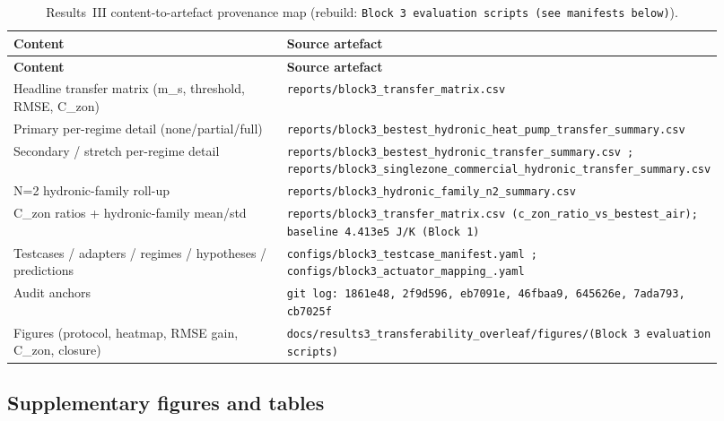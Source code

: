 \documentclass[11pt,a4paper]{article}
\begin{document}
\footnotesize
\begin{longtable}{@{}p{0.40\linewidth} p{0.52\linewidth}@{}}
\caption{Results~III content-to-artefact provenance map (rebuild: \texttt{Block~3 evaluation scripts (see manifests below)}).}\label{tab:prov-r3}\\
\textbf{Content} & \textbf{Source artefact}\\ \midrule \endfirsthead
\textbf{Content} & \textbf{Source artefact}\\ \midrule \endhead
Headline transfer matrix (m\_s, threshold, RMSE, C\_zon) & \texttt{reports/\allowbreak block3\_\allowbreak transfer\_\allowbreak matrix.csv} \\
Primary per-regime detail (none/partial/full) & \texttt{reports/\allowbreak block3\_\allowbreak bestest\_\allowbreak hydronic\_\allowbreak heat\_\allowbreak pump\_\allowbreak transfer\_\allowbreak summary.csv} \\
Secondary / stretch per-regime detail & \texttt{reports/\allowbreak block3\_\allowbreak bestest\_\allowbreak hydronic\_\allowbreak transfer\_\allowbreak summary.csv ; reports/\allowbreak block3\_\allowbreak singlezone\_\allowbreak commercial\_\allowbreak hydronic\_\allowbreak transfer\_\allowbreak summary.csv} \\
N=2 hydronic-family roll-up & \texttt{reports/\allowbreak block3\_\allowbreak hydronic\_\allowbreak family\_\allowbreak n2\_\allowbreak summary.csv} \\
C\_zon ratios + hydronic-family mean/std & \texttt{reports/\allowbreak block3\_\allowbreak transfer\_\allowbreak matrix.csv (c\_\allowbreak zon\_\allowbreak ratio\_\allowbreak vs\_\allowbreak bestest\_\allowbreak air); baseline 4.413e5 J/\allowbreak K (Block 1)} \\
Testcases / adapters / regimes / hypotheses / predictions & \texttt{configs/\allowbreak block3\_\allowbreak testcase\_\allowbreak manifest.yaml ; configs/\allowbreak block3\_\allowbreak actuator\_\allowbreak mapping\_\allowbreak *.yaml} \\
Audit anchors & \texttt{git log: 1861e48, 2f9d596, eb7091e, 46fbaa9, 645626e, 7ada793, cb7025f} \\
Figures (protocol, heatmap, RMSE gain, C\_zon, closure) & \texttt{docs/\allowbreak results3\_\allowbreak transferability\_\allowbreak overleaf/\allowbreak figures/\allowbreak   (Block 3 evaluation scripts)} \\
\bottomrule
\end{longtable}
\normalsize

\subsection*{Supplementary figures and tables}
\end{document}
